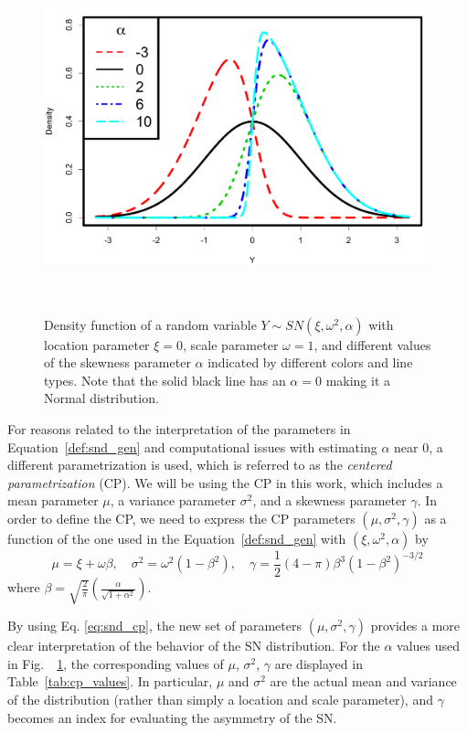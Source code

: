 \documentclass[11pt, oneside]{article}
\begin{document}
\begin{figure}[htbp]
   \centering
\includegraphics[height = 4in]{Skew_Normal_densities_jjck.pdf} 
   \caption{Density function of a random variable $Y \sim SN(\xi, \omega^{2}, \alpha)$ with location parameter $\xi = 0$, scale parameter $\omega = 1$, and different values of the skewness parameter $\alpha$ indicated by different colors and line types.
Note that the solid black line has an $\alpha = 0$ making it a Normal distribution.   
   }
   \label{fig:SN.plot}
\end{figure}
%
For reasons related to the interpretation of the parameters in Equation~\eqref{def:snd_gen} and computational issues with estimating $\alpha$ near 0, a different parametrization is used, which is referred to as the \emph{centered parametrization} (CP).  We will be using the CP in this work, which includes a mean parameter $\mu$, a variance parameter $\sigma^2$, and a skewness parameter $\gamma$.  In order to define the CP, we need to express the CP parameters $(\mu, \sigma^2, \gamma)$ as a function of the one used in the Equation~\eqref{def:snd_gen} with $(\xi, \omega^2, \alpha)$ by
%
\begin{equation} \label{eq:snd_cp}
\mu = \xi + \omega \beta, \quad \sigma^{2} = \omega^{2}(1-\beta^2), \quad \gamma = \frac{1}{2}(4-\pi) \beta^{3}\left(1-\beta^2\right)^{-3/2}
\end{equation}
%
where $\beta = \sqrt{\frac{2}{\pi}}\left(\frac{\alpha}{\sqrt{1+\alpha^2}}\right)$.

By using Eq. \ref{eq:snd_cp}, the new set of parameters $(\mu, \sigma^2, \gamma)$ provides a more clear interpretation of the behavior of the SN distribution. For the $\alpha$ values used in Fig.~~\ref{fig:SN.plot}, the corresponding values of $\mu$, $\sigma^2$, $\gamma$ are displayed in Table~\ref{tab:cp_values}.  In particular, $\mu$ and $\sigma^2$ are the actual mean and variance of the distribution (rather than simply a location and scale parameter), and $\gamma$ becomes an index for evaluating the asymmetry of the SN. 
\end{document}
